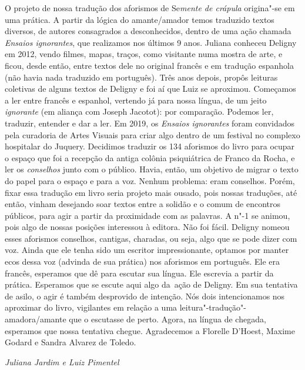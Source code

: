 O projeto de nossa tradução dos aforismos de Se\emph{mente de crápula}
origina"-se em uma prática. A partir da lógica do amante/amador temos
traduzido textos diversos, de autores consagrados a desconhecidos,
dentro de uma ação chamada \emph{Ensaios ignorantes}, que realizamos nos
últimos 9 anos. Juliana conheceu Deligny em 2012, vendo filmes, mapas,
traços, como visitante numa mostra de arte, e ficou, desde então, entre
textos dele no original francês e em tradução espanhola (não havia nada
traduzido em português). Três anos depois, propôs leituras coletivas de
alguns textos de Deligny e foi aí que Luiz se aproximou. Começamos a ler
entre francês e espanhol, vertendo já para nossa língua, de um jeito
\emph{ignorante} (em aliança com Joseph Jacotot): por comparação.
Podemos ler, traduzir, entender e dar a ler. Em 2019, os \emph{Ensaios
ignorantes} foram convidados pela curadoria de Artes Visuais para criar
algo dentro de um festival no complexo hospitalar do Juquery. Decidimos
traduzir os 134 aforismos do livro para ocupar o espaço que foi a
recepção da antiga colônia psiquiátrica de Franco da Rocha, e ler os
\emph{conselhos} junto com o público. Havia, então, um objetivo de
migrar o texto do papel para o espaço e para a voz. Nenhum problema:
eram conselhos. Porém, fixar essa tradução em livro seria projeto mais
ousado, pois nossas traduções, até então, vinham desejando soar textos
entre a solidão e o comum de encontros públicos, para agir a partir da
proximidade com as palavras. A n"-1 se animou, pois algo de nossas
posições interessou à editora. Não foi fácil. Deligny nomeou esses
aforismos conselhos, cantigas, charadas, ou seja, algo que se pode dizer
com voz. Ainda que ele tenha sido um escritor impressionante, optamos
por manter ecos dessa voz (advinda de sua prática) nos aforismos em
português. Ele era francês, esperamos que dê para escutar sua língua.
Ele escrevia a partir da prática. Esperamos que se escute aqui algo
da~ação de Deligny. Em sua tentativa de asilo, o agir é também
desprovido de intenção. Nós dois intencionamos nos aproximar do livro,
vigilantes em relação a uma leitura"-tradução"-amadora/amante que o
escutasse de perto. Agora, na língua de chegada, esperamos que nossa
tentativa chegue. Agradecemos a Florelle D'Hoest, Maxime Godard e Sandra
Alvarez de Toledo.

\hfill{}\emph{Juliana Jardim e Luiz Pimentel}
